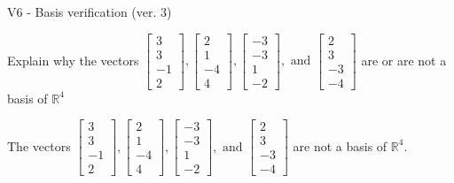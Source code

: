 \begin{exercise}
  \begin{exerciseTitle}V6 - Basis verification (ver. 3)\end{exerciseTitle}
  \begin{exerciseStatement}
    Explain why the vectors \(\left[\begin{array}{r}
3 \\
3 \\
-1 \\
2
\end{array}\right] , \left[\begin{array}{r}
2 \\
1 \\
-4 \\
4
\end{array}\right] , \left[\begin{array}{r}
-3 \\
-3 \\
1 \\
-2
\end{array}\right] , \text{ and } \left[\begin{array}{r}
2 \\
3 \\
-3 \\
-4
\end{array}\right]\) are or are not a basis of \(\mathbb{R}^4\)	


  \end{exerciseStatement}
  \begin{exerciseAnswer}
   The vectors \(\left[\begin{array}{r}
3 \\
3 \\
-1 \\
2
\end{array}\right] , \left[\begin{array}{r}
2 \\
1 \\
-4 \\
4
\end{array}\right] , \left[\begin{array}{r}
-3 \\
-3 \\
1 \\
-2
\end{array}\right] , \text{ and } \left[\begin{array}{r}
2 \\
3 \\
-3 \\
-4
\end{array}\right]\) 
  	 are not  a basis of \(\mathbb{R}^4\).
  


  \end{exerciseAnswer}
\end{exercise}